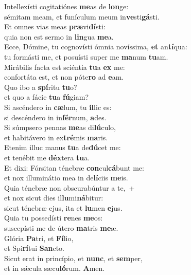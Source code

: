 \evenverse Intellexísti cogitatiónes \textbf{me}as de \textbf{lon}ge:~\*\\
\evenverse sémitam meam, et funículum meum in\textbf{ve}sti\textbf{gá}sti.\\
\oddverse Et omnes vias meas \textbf{præ}vi\textbf{dí}sti:~\*\\
\oddverse quia non est sermo in \textbf{lin}gua \textbf{me}a.\\
\evenverse Ecce, Dómine, tu cognovísti ómnia novíssima, \textbf{et} an\textbf{tí}qua:~\*\\
\evenverse tu formásti me, et posuísti super me \textbf{ma}num \textbf{tu}am.\\
\oddverse Mirábilis facta est sciéntia \textbf{tu}a \textbf{ex} me:~\*\\
\oddverse confortáta est, et non póte\textbf{ro} ad \textbf{e}am.\\
\evenverse Quo ibo a \textbf{spí}ritu \textbf{tu}o?~\*\\
\evenverse et quo a fácie \textbf{tu}a \textbf{fú}giam?\\
\oddverse Si ascéndero in \textbf{cæ}lum, tu \textbf{il}lic es:~\*\\
\oddverse si descéndero in in\textbf{fér}num, \textbf{a}des.\\
\evenverse Si súmpsero pennas \textbf{me}as di\textbf{lú}culo,~\*\\
\evenverse et habitávero in ex\textbf{tré}mis \textbf{ma}ris.\\
\oddverse Etenim illuc manus \textbf{tu}a de\textbf{dú}cet me:~\*\\
\oddverse et tenébit me \textbf{déx}tera \textbf{tu}a.\\
\evenverse Et dixi: Fórsitan ténebræ \textbf{con}cul\textbf{cá}bunt me:~\*\\
\evenverse et nox illuminátio mea in de\textbf{lí}ciis \textbf{me}is.\\
\oddverse Quia ténebræ non obscurabúntur a te,~+\\
\oddverse  et nox sicut dies il\textbf{lu}mi\textbf{ná}bitur:~\*\\
\oddverse sicut ténebræ ejus, ita et \textbf{lu}men \textbf{e}jus.\\
\evenverse Quia tu possedísti \textbf{re}nes \textbf{me}os:~\*\\
\evenverse suscepísti me de útero \textbf{ma}tris \textbf{me}æ.\\
\oddverse Glória \textbf{Pa}tri, et \textbf{Fí}lio,~\*\\
\oddverse et Spi\textbf{rí}tui \textbf{San}cto.\\
\evenverse Sicut erat in princípio, et \textbf{nunc}, et \textbf{sem}per,~\*\\
\evenverse et in sǽcula sæcu\textbf{ló}rum. \textbf{A}men.\\

